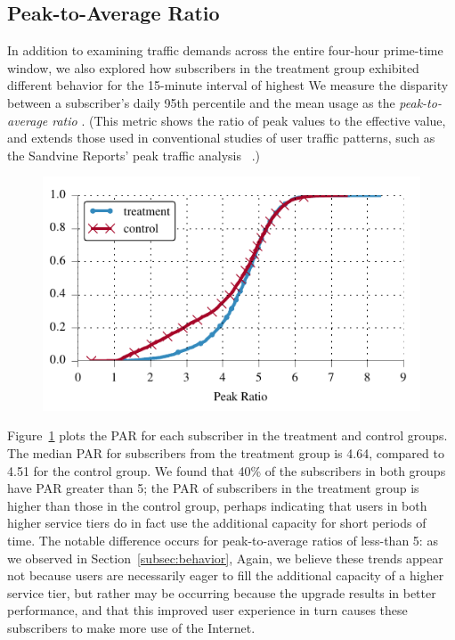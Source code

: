 \subsection{Peak-to-Average Ratio}\label{subsec:peakratio}

In addition to examining traffic demands across the entire four-hour
prime-time window, we also explored how subscribers in the treatment
group exhibited different behavior for the 15-minute interval of highest  We measure the disparity
between a subscriber's daily 95th percentile and 
the mean usage as the \emph{peak-to-average ratio} . (This metric
shows the ratio of peak values to the effective value, and extends those used
in conventional studies of user traffic patterns, such as the Sandvine
Reports' peak traffic analysis ~\cite{sandvine20141h}.) 

\begin{figure}[t]
\centering
\includegraphics[width=.75\linewidth]{figures/peakratio_cdf_mean-devices.pdf}
\caption{}
\label{fig:CDF-peak-ratio-mean}
\end{figure}

Figure~\ref{fig:CDF-peak-ratio-mean} plots the PAR for each 
subscriber in the treatment and control groups. The median PAR
 for subscribers from the treatment group is 4.64, compared to 4.51
for the control group.
We found that 40\% of the subscribers in both groups have PAR
greater than 5; the PAR of subscribers in the treatment group is higher than those in the
control group, perhaps indicating that users in both higher service tiers do
in fact use the additional capacity for short periods of time. The
notable difference occurs for peak-to-average ratios of less-than 5: as
we observed in Section~\ref{subsec:behavior},   Again, we believe these trends
appear not because users are necessarily eager to fill the additional
capacity of a higher service tier, but rather may be occurring because the upgrade
results in better performance, and that this improved user experience in
turn causes these subscribers to make more use of the Internet.

